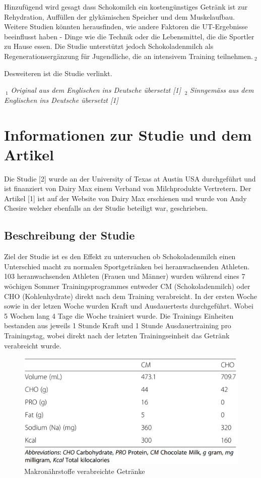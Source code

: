 \documentclass[
]{article}
\begin{document}
Hinzufügend wird gesagt dass Schokomilch ein kostengünstiges Getränk ist
zur Rehydration, Auffüllen der glykämischen Speicher und dem
Muskelaufbau. Weitere Studien könnten herausfinden, wie andere Faktoren
die UT-Ergebnisse beeinflusst haben - Dinge wie die Technik oder die
Lebensmittel, die die Sportler zu Hause essen. Die Studie unterstützt
jedoch Schokoladenmilch als Regenerationsergänzung für Jugendliche, die
an intensivem Training teilnehmen.\(\ _{2}\)

Desweiteren ist die Studie verlinkt.

\(\ _{1}\) \emph{Original aus dem Englischen ins Deutsche übersetzt
{[}1{]}} \(\ _{2}\) \emph{Sinngemäss aus dem Englischen ins Deutsche
übersetzt {[}1{]}}

\newpage

\hypertarget{informationen-zur-studie-und-dem-artikel}{%
\section{Informationen zur Studie und dem
Artikel}\label{informationen-zur-studie-und-dem-artikel}}

Die Studie {[}2{]} wurde an der University of Texas at Austin USA
durchgeführt und ist finanziert von Dairy Max einem Verband von
Milchprodukte Vertretern. Der Artikel {[}1{]} ist auf der Website von
Dairy Max erschienen und wurde von Andy Chesire welcher ebenfalls an der
Studie beteiligt war, geschrieben.

\hypertarget{beschreibung-der-studie}{%
\subsection{Beschreibung der Studie}\label{beschreibung-der-studie}}

Ziel der Studie ist es den Effekt zu untersuchen ob Schokoladenmilch
einen Unterschied macht zu normalen Sportgetränken bei heranwachsenden
Athleten. 103 heranwachsenden Athleten (Frauen und Männer) wurden
während eines 7 wöchigen Sommer Trainingsprogrammes entweder CM
(Schokoladenmilch) oder CHO (Kohlenhydrate) direkt nach dem Training
verabreicht. In der ersten Woche sowie in der letzen Woche wurden Kraft
und Ausdauertests durchgeführt. Wobei 5 Wochen lang 4 Tage die Woche
trainiert wurde. Die Trainings Einheiten bestanden aus jeweils 1 Stunde
Kraft und 1 Stunde Ausdauertraining pro Trainingstag, wobei direkt nach
der letzten Trainingseinheit das Getränk verabreicht wurde.

\begin{figure}

{\centering \includegraphics[width=0.6\linewidth]{makronaehrstoffe} 

}

\caption{Makronährstoffe verabreichte Getränke}\label{fig:makro}
\end{figure}
\end{document}
